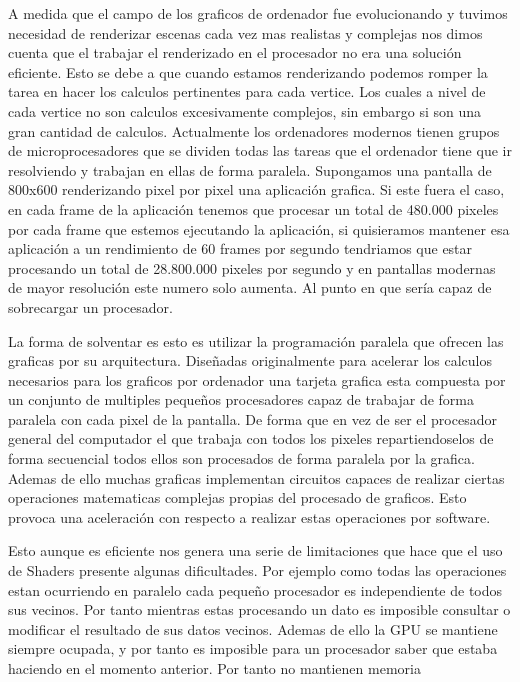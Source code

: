 A medida que el campo de los graficos de ordenador fue evolucionando y tuvimos necesidad de renderizar escenas cada vez mas realistas y complejas nos dimos cuenta que el trabajar el renderizado en el procesador no era una solución eficiente. Esto se debe a que cuando estamos renderizando podemos romper la tarea en hacer los calculos pertinentes para cada vertice. Los cuales a nivel de cada vertice
no son calculos excesivamente complejos, sin embargo si son una gran cantidad de calculos. Actualmente los ordenadores modernos tienen grupos de microprocesadores que se dividen todas las tareas que el ordenador tiene que ir resolviendo y trabajan en ellas de forma paralela. Supongamos una pantalla de 800x600 renderizando pixel por pixel una aplicación grafica. Si este fuera el caso, en cada frame de la aplicación
tenemos que procesar un total de 480.000 pixeles por cada frame que estemos ejecutando la aplicación, si quisieramos mantener esa aplicación a un rendimiento de 60 frames por segundo tendriamos que estar procesando un total de 28.800.000 pixeles por segundo y en pantallas modernas de mayor resolución este numero solo aumenta. Al punto en que sería capaz de sobrecargar un procesador. \cite{thebookofshadersBookShaders}

La forma de solventar es esto es utilizar la programación paralela que ofrecen las graficas por su arquitectura. Diseñadas originalmente para acelerar los calculos necesarios para los graficos por ordenador una tarjeta grafica esta compuesta por un conjunto de multiples pequeños procesadores capaz de trabajar de forma paralela con cada pixel de la pantalla. De forma que en vez de ser el procesador general del computador el que trabaja con todos los pixeles repartiendoselos de forma secuencial todos ellos son procesados de forma paralela por la grafica. Ademas de ello 
muchas graficas implementan circuitos capaces de realizar ciertas operaciones matematicas complejas propias del procesado de graficos. Esto provoca una aceleración con respecto a realizar estas operaciones por software.

Esto aunque es eficiente nos genera una serie de limitaciones que hace que el uso de Shaders presente algunas dificultades. Por ejemplo como todas las operaciones estan ocurriendo en paralelo cada pequeño procesador es independiente de todos sus vecinos. Por tanto mientras estas procesando un dato es imposible consultar o modificar el resultado de sus datos vecinos. Ademas de ello la GPU se mantiene siempre ocupada, y por tanto es imposible para un procesador saber que estaba haciendo en el momento anterior. Por tanto no mantienen memoria

